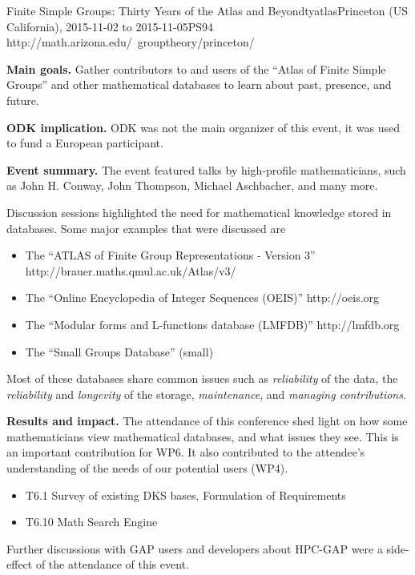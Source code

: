 \begin{event}{Finite Simple Groups: Thirty Years of the Atlas and
    Beyond}{tyatlas}{Princeton (US California), 2015-11-02 to 2015-11-05}{PS}{94
    }{http://math.arizona.edu/~grouptheory/princeton/}

\textbf{Main goals.} Gather contributors to and users of the ``Atlas of Finite
Simple Groups'' and other mathematical databases to learn about past, presence,
and future.

\textbf{ODK implication.} ODK was not the main organizer of this event, it was used to fund
a European participant.

\textbf{Event summary.} The event featured talks by high-profile mathematicians,
such as John H. Conway, John Thompson, Michael Aschbacher, and many more.

Discussion sessions highlighted the need for mathematical knowledge
stored in databases. Some major examples that were discussed are
\begin{itemize}
  \item The ``ATLAS of Finite Group Representations - Version 3''
    http://brauer.maths.qmul.ac.uk/Atlas/v3/
  \item The ``Online Encyclopedia of Integer Sequences (OEIS)''
    http://oeis.org
  \item The ``Modular forms and L-functions database (LMFDB)''
    http://lmfdb.org
  \item The ``Small Groups Database'' (small)
\end{itemize}

Most of these databases share common issues such as \emph{reliability} of the
data, the \emph{reliability} and \emph{longevity} of the storage,
\emph{maintenance}, and \emph{managing contributions}.
    
\textbf{Results and impact.} 
The attendance of this conference shed light on how some mathematicians view
mathematical databases, and what issues they see. This is an important
contribution for WP6. It also contributed to the attendee's understanding of the
needs of our potential users (WP4).

\begin{itemize}
\item T6.1 Survey of existing DKS bases, Formulation of Requirements
\item T6.10 Math Search Engine

\end{itemize}

Further discussions with GAP users and developers about HPC-GAP were a
side-effect of the attendance of this event. 

\end{event}